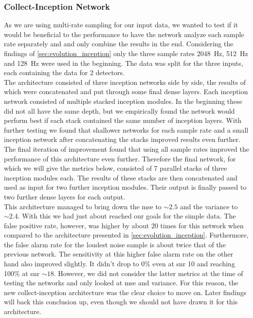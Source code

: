 \subsubsection{Collect-Inception Network}\label{sec:evolution_collect_inception}
As we are using multi-rate sampling for our input data, we wanted to test if it would be beneficial to the performance to have the network analyze each sample rate separately and and only combine the results in the end. Considering the findings of \autoref{sec:evolution_inception} only the three sample rates \SI{2048}{\hertz}, \SI{512}{\hertz} and \SI{128}{\hertz} were used in the beginning. The data was split for the three inputs, each containing the data for 2 detectors.\\
The architecture consisted of three inception networks side by side, the results of which were concatenated and put through some final dense layers. Each inception network consisted of multiple stacked inception modules. In the beginning these did not all have the same depth, but we empirically found the network would perform best if each stack contained the same number of inception layers. With further testing we found that shallower networks for each sample rate and a small inception network after concatenating the stacks improved results even further. The final iteration of improvement found that using all sample rates improved the performance of this architecture even further. Therefore the final network, for which we will give the metrics below, consisted of 7 parallel stacks of three inception modules each. The results of these stacks are then concatenated and used as input for two further inception modules. Their output is finally passed to two further dense layers for each output.\\
This architecture managed to bring down the \gls{mse} to $\sim 2.5$ and the variance to $\sim 2.4$. With this we had just about reached our goals for the simple data. The false positive rate, however, was higher by about 20 times for this network when compared to the architecture presented in \autoref{sec:evolution_inception}. Furthermore, the false alarm rate for the loudest noise sample is about twice that of the previous network. The sensitivity at this higher false alarm rate on the other hand also improved slightly. It didn't drop to 0\% even at \gls{snr} 10 and reaching 100\% at \gls{snr} $\sim 18$. However, we did not consider the latter metrics at the time of testing the networks and only looked at \gls{mse} and variance. For this reason, the new collect-inception architecture was the clear choice to move on. Later findings will back this conclusion up, even though we should not have drawn it for this architecture.\\
